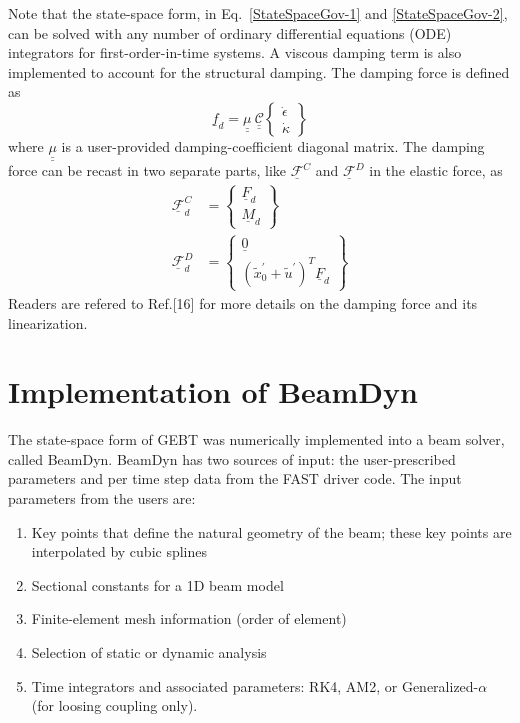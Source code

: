 \documentclass{aiaa-tc}
\newcommand{\tens}[1]{\underline{\underline{#1}}}
\renewcommand{\vec}[1]{\underline{#1}}
\begin{document}
Note that the state-space form, in
Eq.~\eqref{StateSpaceGov-1} and \eqref{StateSpaceGov-2}, can be solved with
any number of ordinary differential equations (ODE) integrators
for first-order-in-time systems. A viscous damping term is also implemented to account for the structural damping. The damping force is defined as
\begin{equation}
   \label{Damping}
   \vec{f}_d = \tens{\mu}~ \tens{\mathcal{C}} \begin{Bmatrix}
   \dot{\epsilon} \\
   \dot{\kappa}
   \end{Bmatrix}
\end{equation}
where $ \tens{\mu}$ is a user-provided damping-coefficient diagonal matrix. The damping force can be recast in two separate parts, like $\vec{\mathcal{F}}^C$ and $\vec{\mathcal{F}}^D$ in the elastic force, as
\begin{align}
   \label{DampingForce-1}
   \vec{\mathcal{F}}^C_d &= \begin{Bmatrix}
   \vec{F}_d \\
   \vec{M}_d
   \end{Bmatrix} \\
   \label{DampingForce-2}
   \vec{\mathcal{F}}^D_d &= \begin{Bmatrix}
    \vec{0} \\
    (\tilde{x}^\prime_0 + \tilde{u}^\prime)^T \underline{F}_d
    \end{Bmatrix}   
\end{align}
Readers are refered to Ref.[16] for more details on the damping force and its linearization.

\section{Implementation of BeamDyn}
The state-space form of GEBT was numerically implemented into a beam solver, called BeamDyn. BeamDyn has two sources of input:  the user-prescribed parameters and per time step data from the FAST driver code. The input parameters from the users are:
\begin{enumerate}
    \item Key points that define the natural geometry of the beam; these key points are interpolated by cubic splines
    \item Sectional constants for a 1D beam model
    \item Finite-element mesh information (order of element)
    \item Selection of static \cite{Wang:GEBT2014} or dynamic analysis
    \item Time integrators and associated parameters: RK4, AM2, or Generalized-$\alpha$ (for loosing coupling only).
\end{enumerate}
\end{document}

